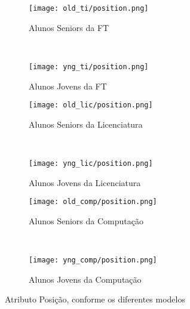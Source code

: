 \clearpage
\begin{figure}[!ht]
    \centering
    \begin{subfigure}[b]{0.48\textwidth}
        \centering
        \texttt{[image: old\_ti/position.png]}
        \caption{Alunos Seniors da FT}
    \end{subfigure}
    ~
    \begin{subfigure}[b]{0.48\textwidth}
        \centering
        \texttt{[image: yng\_ti/position.png]}
        \caption{Alunos Jovens da FT}
    \end{subfigure}

    \begin{subfigure}[b]{0.48\textwidth}
        \centering
        \texttt{[image: old\_lic/position.png]}
        \caption{Alunos Seniors da Licenciatura}
    \end{subfigure}
    ~
    \begin{subfigure}[b]{0.48\textwidth}
        \centering
        \texttt{[image: yng\_lic/position.png]}
        \caption{Alunos Jovens da Licenciatura}
    \end{subfigure}

    \begin{subfigure}[b]{0.48\textwidth}
        \centering
        \texttt{[image: old\_comp/position.png]}
        \caption{Alunos Seniors da Computação}
    \end{subfigure}
    ~
    \begin{subfigure}[b]{0.48\textwidth}
        \centering
        \texttt{[image: yng\_comp/position.png]}
        \caption{Alunos Jovens da Computação}
    \end{subfigure}
    \caption{Atributo Posição, conforme os diferentes modelos}
\end{figure}

